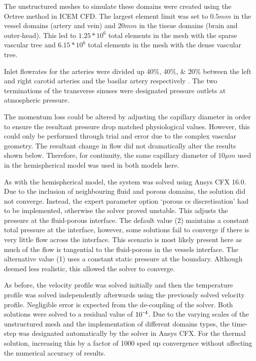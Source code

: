 \documentclass[11pt,english,a4paper,twoside,openright]{report}
\newcommand{\smallminus}{\scalebox{0.5}[1.0]{$-$}}
\begin{document}
{{{{{{{{The unstructured meshes to simulate these domains were created using the Octree method in ICEM CFD. The largest element limit was set to $0.5mm$ in the vessel domains (artery and vein) and $20mm$ in the tissue domains (brain and outer-head). This led to $1.25*10^{6}$ total elements in the mesh with the sparse vascular tree and $6.15*10^{6}$ total elements in the mesh with the dense vascular tree.

Inlet flowrates for the arteries were divided up 40\%, 40\%, \& 20\% between the left and right carotid arteries and the basilar artery respectively \cite{tanaka2006relationship}. The two terminations of the transverse sinuses were designated pressure outlets at atmospheric pressure. 

The momentum loss could be altered by adjusting the capillary diameter in order to ensure the resultant pressure drop matched physiological values. However, this could only be performed through trial and error due to the complex vascular geometry. The resultant change in flow did not dramatically alter the results shown below. Therefore, for continuity, the same capillary diameter of $10\mu m$ used in the hemispherical model was used in both models here. 

As with the hemispherical model, the system was solved using Ansys CFX 16.0. Due to the inclusion of neighbouring fluid and porous domains, the solution did not converge. Instead, the expert parameter option `porous cs discretisation' had to be implemented, otherwise the solver proved unstable. This adjusts the pressure at the fluid-porous interface. The default value (2) maintains a constant total pressure at the interface, however, some solutions fail to converge if there is very little flow across the interface. This scenario is most likely present here as much of the flow is tangential to the fluid-porous in the vessels interface. The alternative value (1) uses a constant static pressure at the boundary. Although deemed less realistic, this allowed the solver to converge.

As before, the velocity profile was solved initially and then the temperature profile was solved independently afterwards using the previously solved velocity profile. Negligible error is expected from the de-coupling of the solver. Both solutions were solved to a residual value of $10^{\smallminus4}$. Due to the varying scales of the unstructured mesh and the implementation of different domains types, the time-step was designated automatically by the solver in Ansys CFX. For the thermal solution, increasing this by a factor of 1000 sped up convergence without affecting the numerical accuracy of results. 

}}}}}}}}
\end{document}
